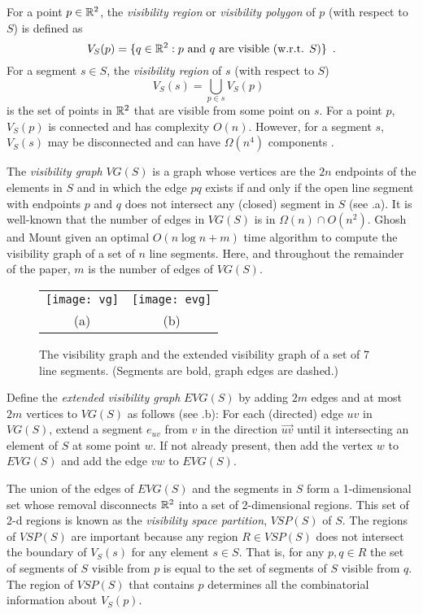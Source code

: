 \documentclass{patmorin}
\newcommand{\VG}{\mathit{VG}}
\newcommand{\EVG}{\mathit{EVG}}
\newcommand{\VSP}{\mathit{VSP}}
\begin{document}
For a point $p\in\mathbb{R}^2$, the \emph{visibility region} or \emph{visibility
polygon} of $p$ (with respect to $S$) is defined as
\[
   V_S(p)=\{q\in\mathbb{R}^2:\mbox{$p$ and $q$ are visible (w.r.t. $S$)}\} 
      \enspace .
\]
For a segment $s\in S$, the \emph{visibility region} of $s$ (with respect
to $S$)
\[
   V_S(s)=\bigcup_{p\in s} V_S(p) \enspace 
\]
is the set of points in $\mathbb{R}^2$ that are visible from some point on $s$.
For a point $p$, $V_S(p)$ is connected and has complexity $O(n)$.  However,
for a segment $s$, $V_S(s)$ may be disconnected and can have $\Omega(n^4)$
components \cite{mXX,fXX}.

The \emph{visibility graph} $\VG(S)$ is a graph whose vertices are the $2n$
endpoints of the elements in $S$ and in which the edge $pq$ exists if and
only if the open line segment with endpoints $p$ and $q$ does not intersect
any (closed) segment in $S$ (see .a).  It is well-known that the
number of edges in $\VG(S)$ is in $\Omega(n)\cap O(n^2)$.  Ghosh and Mount
\cite{gmXX} given an optimal $O(n\log n+ m)$ time algorithm to compute the
visibility graph of a set of $n$ line segments.  Here, and throughout the
remainder of the paper, $m$ is the number of edges of $\VG(S)$.

\begin{figure}
  \begin{center}
    \begin{tabular}{cc}
    \texttt{[image: vg]} & \texttt{[image: evg]} \\
    (a) & (b)
    \end{tabular}
  \end{center}
  \caption{The visibility graph and the extended visibility graph of a set
       of 7 line segments. (Segments are bold, graph edges are dashed.)}
\end{figure}

Define the \emph{extended visibility graph} $\EVG(S)$ by adding $2m$ edges
and at most $2m$ vertices to $\VG(S)$ as follows (see .b): For
each (directed) edge $uv$ in $\VG(S)$, extend a segment
$e_{uv}$ from $v$ in the direction $\overrightarrow{uv}$ until it
intersecting an element of $S$ at some point $w$.  If not already present,
then add the vertex $w$ to $\EVG(S)$ and add the edge $vw$ to $\EVG(S)$.

The union of the edges of $\EVG(S)$ and the segments in $S$ form a
1-dimensional set whose removal disconnects $\mathbb{R}^2$ into a set of
2-dimensional regions.  This set of 2-d regions is known as the
\emph{visibility space partition}, $\VSP(S)$ of $S$.  The regions of
$\VSP(S)$ are important because any region $R\in\VSP(S)$ does not intersect
the boundary of $V_S(s)$ for any element $s\in S$. That is, for any $p,q\in
R$ the set of segments of $S$ visible from $p$ is equal to the set of
segments of $S$ visible from $q$.  The region of $\VSP(S)$ that contains
$p$ determines all the combinatorial information about $V_S(p)$.
\end{document}
